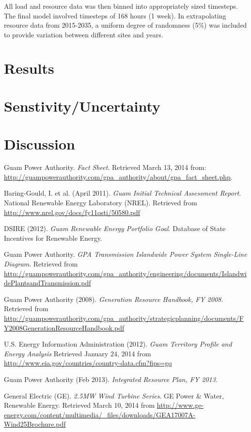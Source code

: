 \documentclass[12pt,letterpaper,fleqn]{report}
\begin{document}
All load and resource data was then binned into appropriately sized
timesteps. The final model involved timesteps of 168 hours (1
week). In extrapolating resource data from 2015-2035, a uniform
degree of randomness (5\%) was included to provide variation between
different sites and years. 

\section{Results}

\section{Senstivity/Uncertainty}

\section{Discussion}

\begin{thebibliography}{99}

  Guam Power Authority.
  \emph{Fact Sheet}.
  Retrieved March 13, 2014 from: 
  \url{http://guampowerauthority.com/gpa_authority/about/gpa_fact_sheet.php}.

  Baring-Gould, I. et al. (April 2011).
  \emph{Guam Initial Technical Assessment Report}.
  National Renewable Energy Laboratory (NREL).
  Retrieved from \url{http://www.nrel.gov/docs/fy11osti/50580.pdf}

  DSIRE (2012).
  \emph{Guam Renewable Energy Portfolio Goal}.
  Database of State Incentives for Renewable Energy.
  
  Guam Power Authority.
  \emph{GPA Transmission Islandwide Power System Single-Line Diagram}.
  Retrieved from 
  \url{http://guampowerauthority.com/gpa_authority/engineering/documents/IslandwidePlantsandTransmission.pdf}

  Guam Power Authority (2008).
  \emph{Generation Resource Handbook, FY 2008}.
  Retrieved from
  \url{http://guampowerauthority.com/gpa_authority/strategicplanning/documents/FY2008GenerationResourceHandbook.pdf}

  U.S. Energy Information Administration (2012).
  \emph{Guam Territory Profile and Energy Analysis}
  Retrieved January 24, 2014 from
  \url{http://www.eia.gov/countries/country-data.cfm?fips=gq}
  
  Guam Power Authority (Feb 2013).
  \emph{Integrated Resource Plan, FY 2013}.

  General Electric (GE).
  \emph{2.5MW Wind Turbine Series}.
  GE Power \& Water, Renewable Energy.
  Retrieved March 10, 2014 from
  \url{http://www.ge-energy.com/content/multimedia/_files/downloads/GEA17007A-Wind25Brochure.pdf}

\end{thebibliography}
\end{document}
